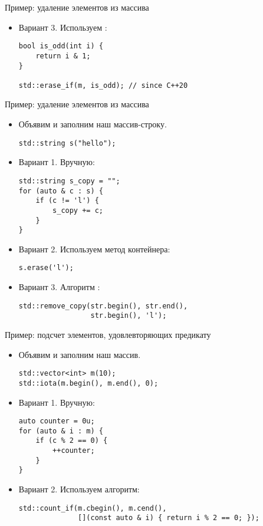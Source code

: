 \documentclass{beamer}
\begin{document}
\begin{frame}[fragile]{Пример: удаление элементов из массива}
    \begin{itemize}
        \item Вариант 3. Используем :
            \begin{lstlisting}
bool is_odd(int i) {
    return i & 1;
}

std::erase_if(m, is_odd); // since C++20
            \end{lstlisting}
    \end{itemize}
\end{frame}

\begin{frame}[fragile]{Пример: удаление элементов из массива}
    \begin{itemize}
        \item Объявим и заполним наш массив-строку.
            \begin{lstlisting}
std::string s("hello");
            \end{lstlisting}
        \item Вариант 1. Вручную:
            \begin{lstlisting}
std::string s_copy = "";
for (auto & c : s) {
    if (c != 'l') {
        s_copy += c;
    }
}
            \end{lstlisting}
        \item Вариант 2. Используем метод контейнера:
            \begin{lstlisting}
s.erase('l');
            \end{lstlisting}
        \item Вариант 3. Алгоритм :
            \begin{lstlisting}
std::remove_copy(str.begin(), str.end(),
                 str.begin(), 'l');
            \end{lstlisting}
    \end{itemize}
\end{frame}

\begin{frame}[fragile]{Пример: подсчет элементов, удовлевторяющих предикату}
    \begin{itemize}
        \item Объявим и заполним наш массив.
            \begin{lstlisting}
std::vector<int> m(10);
std::iota(m.begin(), m.end(), 0);
            \end{lstlisting}
        \item Вариант 1. Вручную:
            \begin{lstlisting}
auto counter = 0u;
for (auto & i : m) {
    if (c % 2 == 0) {
        ++counter;
    }
}
            \end{lstlisting}
        \item Вариант 2. Используем алгоритм:
            \begin{lstlisting}
std::count_if(m.cbegin(), m.cend(),
              [](const auto & i) { return i % 2 == 0; });
            \end{lstlisting}
    \end{itemize}
\end{frame}
\end{document}
